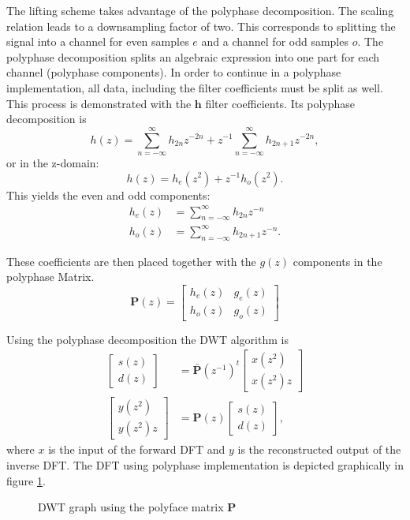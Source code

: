 \begin{refsection}
The lifting scheme takes advantage of the polyphase decomposition.
The scaling relation leads to a downsampling factor of two.
This corresponds to splitting the signal into a channel for even samples $e$ and a channel for odd samples $o$.
The polyphase decomposition splits an algebraic expression into one part for each channel (polyphase components).
In order to continue in a polyphase implementation, all data, including the filter coefficients must be split as well.
This process is demonstrated with the $\bm h$ filter coefficients.
Its polyphase decomposition is
\begin{equation}
	h(z) = \sum_{n=-\infty}^{\infty} h_{2n} z^{-2n} + z^{-1} \sum_{n=-\infty}^{\infty} h_{2n+1} z^{-2n},
\end{equation}
or in the z-domain:
\begin{equation}
	h(z)=h_{e}(z^2) + z^{-1} h_o(z^2).
\end{equation}
This yields the even and odd components:
\begin{align}
	h_e(z) &= \sum_{n=-\infty}^{\infty} h_{2n}z^{-n}
	\\
	h_o(z) &= \sum_{n=-\infty}^{\infty} h_{2n+1}z^{-n}.
\end{align}

These coefficients are then placed together with the $g(z)$ components in the polyphase Matrix.
\begin{equation}
	\bm P(z) = 
	\begin{bmatrix}
	h_e(z) & g_e(z) \\
	h_o(z) & g_o(z)
	\end{bmatrix}
\end{equation}

Using the polyphase decomposition the DWT algorithm is
\begin{align}
\begin{bmatrix}
	s(z) \\
	d(z)
\end{bmatrix}
&=
\bm{\bar P}(z^{-1})^t
\begin{bmatrix}
	x(z^2) \\
	x(z^2) z
\end{bmatrix}
\\
\begin{bmatrix}
	y(z^2) \\
	y(z^2) z
\end{bmatrix}
&=
\bm P(z)
\begin{bmatrix}
	s(z) \\
	d(z)
\end{bmatrix}
,
\end{align}
where $x$ is the input of the forward DFT and $y$ is the reconstructed output of the inverse DFT.
The DFT using polyphase implementation is depicted graphically in figure \ref{fpga:fig:liftingSteps}.
\begin{figure}
	\centering
	
	\caption{DWT graph using the polyface matrix $\bm P$}
	\label{fpga:fig:liftingSteps}
\end{figure}



\end{refsection}
